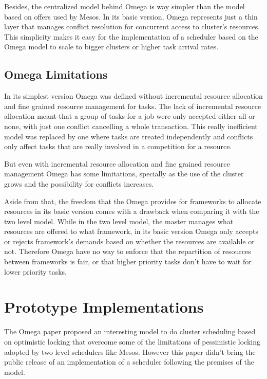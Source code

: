 \documentclass{report}                     %
\begin{document}
Besides, the centralized model behind Omega is way simpler than the
model based on offers used by Mesos. In its basic version, Omega
represents just a thin layer that manages conflict resolution for
concurrent access to cluster's resources. This simplicity makes it
easy for the implementation of a scheduler based on the Omega model to
scale to bigger clusters or higher task arrival rates.

\section{Omega Limitations}

In its simplest version Omega was defined without incremental
resource allocation and fine grained resource management for tasks.
The lack of incremental resource allocation meant that a group of
tasks for a job were only accepted either all or none, with just one
conflict cancelling a whole transaction. This really inefficient model
was replaced by one where tasks are treated independently and
conflicts only affect tasks that are really involved in a competition
for a resource.

But even with incremental resource allocation and fine grained
resource management Omega has some limitations, specially as the
use of the cluster grows and the possibility for conflicts
increases. 

Aside from that, the freedom that the Omega provides for frameworks to
allocate resources in its basic version comes with a drawback when
comparing it with the two level model. While in the two level model,
the master manages what resources are offered to what framework, in
its basic version Omega only accepts or rejects framework's demands
based on whether the resources are available or not.  Therefore Omega
have no way to enforce that the repartition of resources between
frameworks is fair, or that higher priority tasks don't have to wait
for lower priority tasks.

\chapter{Prototype Implementations}
\label{sec:implementation}

The Omega paper proposed an interesting model to do cluster
scheduling based on optimistic locking that overcome some of the
limitations of pessimistic locking adopted by two level schedulers like
Mesos. However this paper didn't bring the public release of an
implementation of a scheduler following the premises of the
model. 
\end{document}
